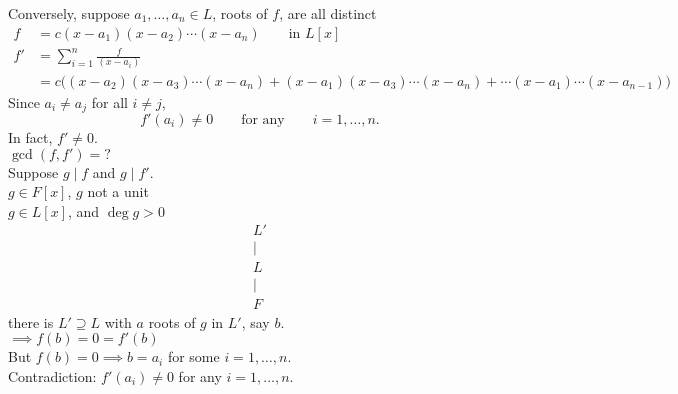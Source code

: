 Conversely, suppose $a_1,\dotsc,a_n\in L$, roots of $f$, are all distinct
\begin{align*}
f &= c(x-a_1)(x-a_2)\dotsm(x-a_n) \qquad \text{in $L[x]$} \\
f' &= \sum_{i=1}^n \frac{f}{(x-a_i)} \\
   &= c\bigl((x-a_2)(x-a_3)\dotsm(x-a_n)+(x-a_1)(x-a_3)\dotsm(x-a_n)+\dotsb(x-a_1)\dotsm(x-a_{n-1})\bigr)
\end{align*}
Since $a_i\neq a_j$ for all $i\neq j$,
\[ f'(a_i) \neq 0 \qquad\text{for any}\qquad i=1,\dotsc,n . \]
In fact, $f'\neq0$. \\
$\gcd(f,f')=\text{?}$ \\
Suppose $g\mid f$ and $g\mid f'$. \\
$g\in F[x]$, $g$ not a unit \\
$g\in L[x]$, and $\deg g>0$
\begin{gather*}
L' \\
| \\
L \\
| \\
F
\end{gather*}
there is $L'\supseteq L$ with $a$ roots of $g$ in $L'$, say $b$. \\
$\implies f(b)=0=f'(b)$ \\
But $f(b)=0\implies b=a_i$ for some $i=1,\dotsc,n$. \\
Contradiction: $f'(a_i)\neq0$ for any $i=1,\dotsc,n$.
